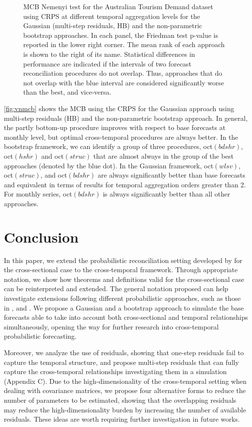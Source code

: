 \documentclass[12pt]{article}
\theoremstyle{definition}
\begin{document}
\begin{figure}[p]
	\caption{MCB Nemenyi test for the Australian Tourism Demand dataset using CRPS at different temporal aggregation levels for the Gaussian (multi-step residuals, HB) and the non-parametric bootstrap approaches. In each panel, the Friedman test p-value is reported in the lower right corner. The mean rank of each approach is shown to the right of its name. Statistical differences in performance are indicated if the intervals of two forecast reconciliation procedures do not overlap. Thus, approaches that do not overlap with the blue interval are considered significantly worse than the best, and vice-versa.}
	\label{fig:vnmcb}
\end{figure}

\autoref{fig:vnmcb} shows the MCB using the CRPS for the Gaussian approach using multi-step residuals (HB) and the non-parametric bootstrap approach. In general, the partly bottom-up procedure improves with respect to base forecasts at monthly level, but optimal cross-temporal procedures are always better. In the bootstrap framework, we can identify a group of three procedures, oct$(bdshr)$, oct$(hshr)$ and oct$(struc)$ that are almost always in the group of the best approaches (denoted by the blue dot). In the Gaussian framework, oct$(wlsv)$, oct$(struc)$, and oct$(bdshr)$ are always significantly better than base forecasts and equivalent in terms of results for temporal aggregation orders greater than 2. For monthly series, oct$(bdshr)$ is always significantly better than all other approaches.

\section{Conclusion}\label{sec:conclusion}

In this paper, we extend the probabilistic reconciliation setting developed by \cite{panagiotelis2023} for the cross-sectional case to the cross-temporal framework. Through appropriate notation, we show how theorems and definitions valid for the cross-sectional case can be reinterpreted and extended. The general notation proposed can help investigate extensions following different probabilistic approaches, such as those in \cite{jeon2019}, \cite{bentaieb2021} and \cite{corani2022}. We propose a Gaussian and a bootstrap approach to simulate the base forecasts able to take into account both cross-sectional and temporal relationships simultaneously, opening the way for further research into  cross-temporal probabilistic forecasting.

Moreover, we analyze the use of residuals, showing that one-step residuals fail to capture the temporal structure, and propose multi-step residuals that can fully capture the cross-temporal relationships investigating them in a simulation (Appendix C). Due to the high-dimensionality of the cross-temporal setting when dealing with covariance matrices, we propose four alternative forms to reduce the number of parameters to be estimated, showing that the overlapping residuals may reduce the high-dimensionality burden by increasing the number of available residuals. These ideas are worth requiring further investigation in future works.
\end{document}
